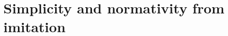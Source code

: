 \providecommand{\Risk}{\mathcal R}
\providecommand{\hRisk}{\hat{\mathcal R}}
\providecommand{\hullm}{\mathrm{hull}^{-}}
\providecommand{\Admiss}{\mathfrak A}
\providecommand{\val}{\mathrm{val}}
\providecommand{\Ax}{\mathrm{Ax}}
\providecommand{\KL}{\mathrm{KL}}
\providecommand{\Unif}{\mathrm{Unif}}
\providecommand{\conv}{\mathrm{conv}}
\providecommand{\Muniv}{\mathbf M}
\providecommand{\muniv}{\mathbf m}

\section{Simplicity and normativity from imitation}\label{sec:simplicity}

